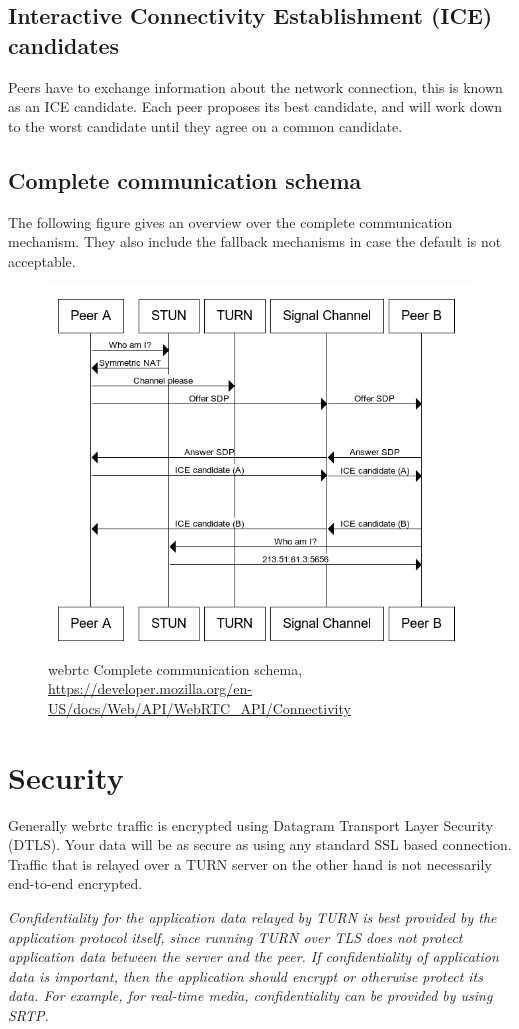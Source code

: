 \subsection{Interactive Connectivity Establishment (ICE) candidates}
Peers have to exchange information about the network connection, this is known as an ICE candidate. Each peer proposes its best candidate, and will work down to the worst candidate until they agree on a common candidate.

\subsection{Complete communication schema}
The following figure gives an overview over the complete communication mechanism. They also include the fallback mechanisms in case the default is not acceptable.

\begin{figure}[H]
	\includegraphics[scale=0.5]{images/webrtc-complete-diagram.png}
	\centering
	\caption{\Gls{webrtc} Complete communication schema, \url{https://developer.mozilla.org/en-US/docs/Web/API/WebRTC_API/Connectivity}}
	\label{fig:WebRTC}
\end{figure}

\section{Security}
Generally \Gls{webrtc} traffic is encrypted using Datagram Transport Layer Security (DTLS). Your data will be as secure as using any standard SSL based connection. Traffic that is relayed over a TURN server on the other hand is not necessarily end-to-end encrypted.

\textit{Confidentiality for the application data relayed by TURN is best provided by the application protocol itself, since running TURN over TLS does not protect application data between the server and the peer. If confidentiality of application data is important, then the application should encrypt or otherwise protect its data. For example, for real-time media, confidentiality can be provided by using SRTP.}~\cite{TURN:sec}
